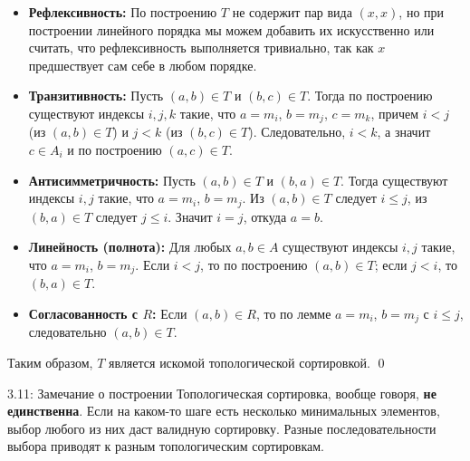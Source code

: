 \documentclass[a4paper,12pt]{article}
\begin{document}
	\begin{itemize}
		\item \textbf{Рефлексивность:} По построению $T$ не содержит пар вида $(x, x)$, но при построении линейного порядка мы можем добавить их искусственно или считать, что рефлексивность выполняется тривиально, так как $x$ предшествует сам себе в любом порядке.
		
		\item \textbf{Транзитивность:} Пусть $(a, b) \in T$ и $(b, c) \in T$. Тогда по построению существуют индексы $i, j, k$ такие, что $a = m_i$, $b = m_j$, $c = m_k$, причем $i < j$ (из $(a, b) \in T$) и $j < k$ (из $(b, c) \in T$). Следовательно, $i < k$, а значит $c \in A_i$ и по построению $(a, c) \in T$.
		
		\item \textbf{Антисимметричность:} Пусть $(a, b) \in T$ и $(b, a) \in T$. Тогда существуют индексы $i, j$ такие, что $a = m_i$, $b = m_j$. Из $(a, b) \in T$ следует $i \le j$, из $(b, a) \in T$ следует $j \le i$. Значит $i = j$, откуда $a = b$.
		
		\item \textbf{Линейность (полнота):} Для любых $a, b \in A$ существуют индексы $i, j$ такие, что $a = m_i$, $b = m_j$. Если $i < j$, то по построению $(a, b) \in T$; если $j < i$, то $(b, a) \in T$.
		
		\item \textbf{Согласованность с $R$:} Если $(a, b) \in R$, то по лемме $a = m_i$, $b = m_j$ с $i \le j$, следовательно $(a, b) \in T$.
	\end{itemize}
	
	Таким образом, $T$ является искомой топологической сортировкой. \qed
	
	\begin{remarkbox}{3.11: Замечание о построении}
		Топологическая сортировка, вообще говоря, \textbf{не единственна}. Если на каком-то шаге есть несколько минимальных элементов, выбор любого из них даст валидную сортировку. Разные последовательности выбора приводят к разным топологическим сортировкам.
	\end{remarkbox}
	
\end{document}
